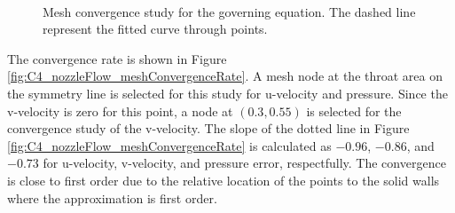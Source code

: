 \begin{figure}[H]
    \centering
    \quad
    \\
    \caption{Mesh convergence study for the governing equation. The dashed line represent the fitted curve through points.}
    \label{fig:C4_nozzleFlow_meshConvergence}
\end{figure}
%
The convergence rate is shown in Figure \ref{fig:C4_nozzleFlow_meshConvergenceRate}. A mesh node at the throat area on the symmetry line is selected for this study for u-velocity and pressure. Since the v-velocity is zero for this point, a node at $(0.3, 0
.55)$ is selected for the convergence study of the v-velocity. The slope of the dotted line in Figure \ref{fig:C4_nozzleFlow_meshConvergenceRate} is calculated as $-0.96$, $-0.86$, and $-0.73$ for u-velocity, v-velocity, and pressure error, respectfully. The convergence is close to first order due to the relative location of the points to the solid walls where the approximation is first order.
%
